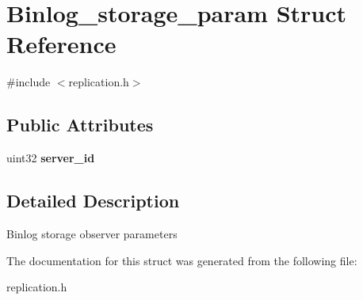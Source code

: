 \hypertarget{structBinlog__storage__param}{}\section{Binlog\+\_\+storage\+\_\+param Struct Reference}
\label{structBinlog__storage__param}


{\ttfamily \#include $<$replication.\+h$>$}

\subsection*{Public Attributes}
\begin{DoxyCompactItemize}
\item 
\mbox{\label{structBinlog__storage__param_a776ffe2322ec3c979654888c115bfa0e}} 
uint32 {\bfseries server\+\_\+id}
\end{DoxyCompactItemize}


\subsection{Detailed Description}
Binlog storage observer parameters 

The documentation for this struct was generated from the following file\+:\begin{DoxyCompactItemize}
\item 
replication.\+h\end{DoxyCompactItemize}
